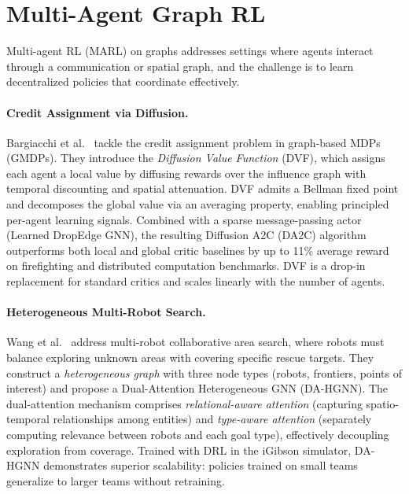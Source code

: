 \documentclass{article}
\begin{document}
\section{Multi-Agent Graph RL}\label{sec:marl}

Multi-agent RL (MARL) on graphs addresses settings where agents interact through a communication or spatial graph, and the challenge is to learn decentralized policies that coordinate effectively.

\paragraph{Credit Assignment via Diffusion.}
Bargiacchi et al.~\cite{dvf2026} tackle the credit assignment problem in graph-based MDPs (GMDPs). They introduce the \emph{Diffusion Value Function} (DVF), which assigns each agent a local value by diffusing rewards over the influence graph with temporal discounting and spatial attenuation. DVF admits a Bellman fixed point and decomposes the global value via an averaging property, enabling principled per-agent learning signals. Combined with a sparse message-passing actor (Learned DropEdge GNN), the resulting Diffusion A2C (DA2C) algorithm outperforms both local and global critic baselines by up to 11\% average reward on firefighting and distributed computation benchmarks. DVF is a drop-in replacement for standard critics and scales linearly with the number of agents.

\paragraph{Heterogeneous Multi-Robot Search.}
Wang et al.~\cite{dahgnn2026} address multi-robot collaborative area search, where robots must balance exploring unknown areas with covering specific rescue targets. They construct a \emph{heterogeneous graph} with three node types (robots, frontiers, points of interest) and propose a Dual-Attention Heterogeneous GNN (DA-HGNN). The dual-attention mechanism comprises \emph{relational-aware attention} (capturing spatio-temporal relationships among entities) and \emph{type-aware attention} (separately computing relevance between robots and each goal type), effectively decoupling exploration from coverage. Trained with DRL in the iGibson simulator, DA-HGNN demonstrates superior scalability: policies trained on small teams generalize to larger teams without retraining.
\end{document}

